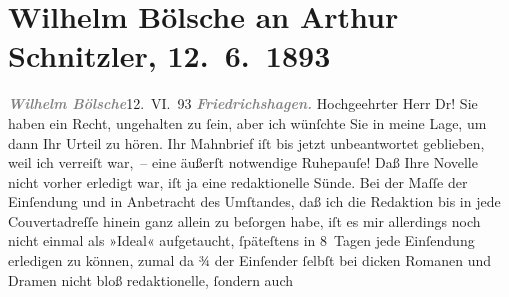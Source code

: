 

         
         \renewcommand{\erwaehntePersonen}{Personen: Cesare Lombroso}
         \renewcommand{\erwaehnteOrte}{Orte: Berlin, Friedrichshagen, Wien}
         \renewcommand{\erwaehnteWerke}{Werke: Die Braut, Die Frau als Verbrecherin und Prostituierte}
               \section[Wilhelm Bölsche an Arthur Schnitzler, 12. 6. 1893]{ Wilhelm Bölsche an Arthur Schnitzler, 12. 6. 1893}\nopagebreak{}\rehead{ }\begin{ledgroupsized}[t]{13cm}\normalsize\beginnumbering \toendnotes[C]{\smallbreak\pagebreak[2]} 
\toendnotes[C]{\smallbreak}\pstart
           {\pb}\textcolor{gray}{\textbf{\textit{Wilhelm Bölsche}}}\hfill 12. VI. 93\pend
           \pstart
           \textcolor{gray}{\textbf{\textit{Friedrichshagen.}}}\pend
           \pstart{}Hochgeehrter Herr Dr!\pend\pstart
           Sie haben ein Recht, ungehalten zu ſein, aber ich wünſchte Sie in meine Lage, um dann
               Ihr Urteil zu hören. Ihr Mahnbrief iſt bis jetzt unbeantwortet geblieben, weil ich
               verreiſt war, – eine äußerſt notwendige Ruhepauſe! Daß Ihre Novelle nicht vorher erledigt war, iſt ja eine redaktionelle
               Sünde. Bei der Maſſe der Einſendung und in Anbetracht des Umſtandes, daß ich die
               Redaktion bis in jede Couvertadreſſe hinein ganz allein zu beſorgen habe, iſt es mir
               allerdings noch nicht einmal als »Ideal« aufgetaucht, ſpäteſtens in 8 Tagen {\pb}jede Einſendung erledigen zu können, zumal da ¾ der
               Einſender ſelbſt bei dicken Romanen und Dramen nicht bloß redaktionelle, ſondern auch

\end{ledgroupsized}
